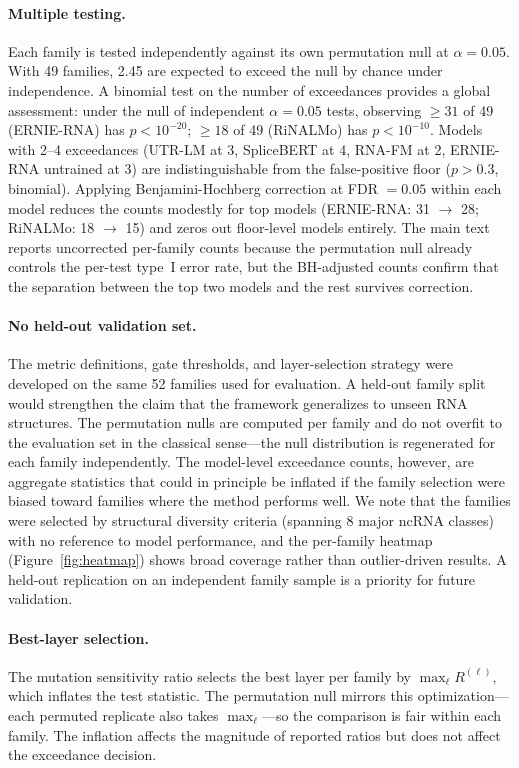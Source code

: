 \documentclass[11pt]{article}
\begin{document}
\paragraph{Multiple testing.}
Each family is tested independently against its own permutation null
at $\alpha = 0.05$. With 49 families, 2.45 are expected to exceed the
null by chance under independence. A binomial test on
the number of exceedances provides a global assessment: under the
null of independent $\alpha = 0.05$ tests, observing $\geq 31$ of 49
(ERNIE-RNA) has $p < 10^{-20}$; $\geq 18$ of 49 (RiNALMo) has
$p < 10^{-10}$. Models with 2--4 exceedances (UTR-LM at 3, SpliceBERT
at 4, RNA-FM at 2, ERNIE-RNA untrained at 3) are
indistinguishable from the false-positive floor ($p > 0.3$,
binomial). Applying Benjamini-Hochberg correction at FDR $= 0.05$
within each model reduces the counts modestly for top models
(ERNIE-RNA: 31 $\to$ 28; RiNALMo: 18 $\to$ 15) and
zeros out floor-level models entirely. The main text reports
uncorrected per-family counts because the permutation null already
controls the per-test type~I error rate, but the BH-adjusted counts
confirm that the separation between the top two models and the rest
survives correction.

\paragraph{No held-out validation set.}
The metric definitions, gate thresholds, and layer-selection strategy
were developed on the same 52 families used for evaluation. A
held-out family split would strengthen the claim that the framework
generalizes to unseen RNA structures. The permutation nulls are
computed per family and do not overfit to the evaluation set in the
classical sense---the null distribution is regenerated for each
family independently. The model-level exceedance counts, however,
are aggregate statistics that could in principle be inflated if the
family selection were biased toward families where the method
performs well. We note that the families were selected by structural
diversity criteria (spanning 8 major ncRNA classes) with no reference
to model performance, and the per-family heatmap
(Figure~\ref{fig:heatmap}) shows broad coverage rather than outlier-driven
results. A held-out replication on an independent family sample is a
priority for future validation.

\paragraph{Best-layer selection.}
The mutation sensitivity ratio selects the best layer per family by
$\max_\ell R^{(\ell)}$, which inflates the test statistic. The
permutation null mirrors this optimization---each permuted replicate
also takes $\max_\ell$---so the comparison is fair within each family.
The inflation affects the magnitude of reported ratios but does not
affect the exceedance decision.
\end{document}
